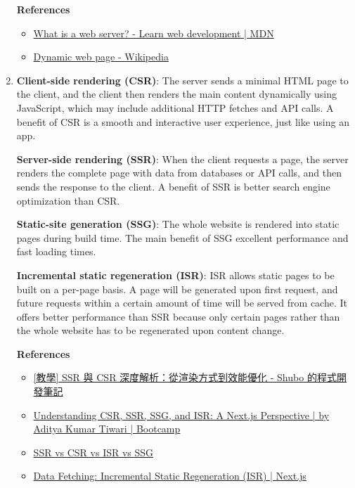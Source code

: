 \documentclass[12pt, a4paper]{article}
\begin{document}
\begin{enumerate}
    \textbf{References}
    \begin{itemize}
      \item \href{https://developer.mozilla.org/en-US/docs/Learn/Common_questions/Web_mechanics/What_is_a_web_server}{What is a web server? - Learn web development | MDN}
      \item \href{https://en.wikipedia.org/wiki/Dynamic_web_page}{Dynamic web page - Wikipedia}
    \end{itemize}

    \pagebreak
    \item \textbf{Client-side rendering (CSR)}: The server sends a minimal HTML page
    to the client, and the client then renders the main content dynamically using
    JavaScript, which may include additional HTTP fetches and API calls.
    A benefit of CSR is a smooth and interactive user experience, just like
    using an app.

    \textbf{Server-side rendering (SSR)}: When the client requests a page, the server
    renders the complete page with data from databases or API calls, and then sends the
    response to the client. A benefit of SSR is better search engine optimization than CSR.

    \textbf{Static-site generation (SSG)}: The whole website is rendered into
    static pages during build time. The main benefit of SSG excellent performance and
    fast loading times.

    \textbf{Incremental static regeneration (ISR)}: ISR allows static pages
    to be built on a per-page basis. A page will be generated upon first request,
    and future requests within a certain amount of time will be served from cache.
    It offers better performance than SSR because only certain pages rather than
    the whole website has to be regenerated upon content change.

    \textbf{References}
    \begin{itemize}
      \item \href{https://www.shubo.io/rendering-patterns/}{[教學] SSR 與 CSR 深度解析：從渲染方式到效能優化 - Shubo 的程式開發筆記}
      \item \href{https://bootcamp.uxdesign.cc/understanding-csr-ssr-ssg-and-isr-a-next-js-perspective-fcaf36686de6}{Understanding CSR, SSR, SSG, and ISR: A Next.js Perspective | by Aditya Kumar Tiwari | Bootcamp}
      \item \href{https://www.educative.io/answers/ssr-vs-csr-vs-isr-vs-ssg}{SSR vs CSR vs ISR vs SSG}
      \item \href{https://nextjs.org/docs/pages/building-your-application/data-fetching/incremental-static-regeneration}{Data Fetching: Incremental Static Regeneration (ISR) | Next.js}
    \end{itemize}


\end{enumerate}
\end{document}
